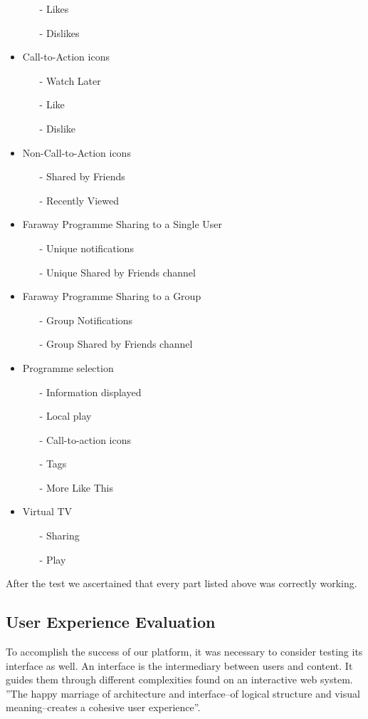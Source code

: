 \documentclass{acm_proc_article-sp}
\begin{document}
\begin{itemize}
\begin{itemize}
  	\item [-]Likes
  	\item [-]Dislikes
  \end{itemize}
  \item Call-to-Action icons
  \begin{itemize}
  	\item [-]Watch Later
  	\item [-]Like
  	\item [-]Dislike
  \end{itemize}
  \item Non-Call-to-Action icons
  \begin{itemize}
  	\item [-]Shared by Friends
  	\item [-]Recently Viewed
  \end{itemize}
  \item Faraway Programme Sharing to a Single User
  \begin{itemize}
  	\item [-]Unique notifications
  	\item [-]Unique Shared by Friends channel
  \end{itemize}
  \item Faraway Programme Sharing to a Group
  \begin{itemize}
  	\item [-]Group Notifications
  	\item [-]Group Shared by Friends channel
  \end{itemize}
  \item Programme selection
  \begin{itemize}
  	\item [-]Information displayed
  	\item [-]Local play
  	\item [-]Call-to-action icons
  	\item [-]Tags
  	\item [-]More Like This
  \end{itemize}
  \item Virtual TV
  \begin{itemize}
  	\item [-]Sharing
  	\item [-]Play
  \end{itemize}
\end{itemize}

After the test we ascertained that every part listed above was correctly working. 
\subsection{User Experience Evaluation}
To accomplish the success of our platform, it was necessary to consider testing its interface as 
well. An interface is the intermediary between users and content. It guides them through different complexities found on an interactive web system. ''The happy marriage of architecture and interface--of logical structure and visual meaning--creates a cohesive user experience''\cite{fleming1998web}. 
\end{document}
